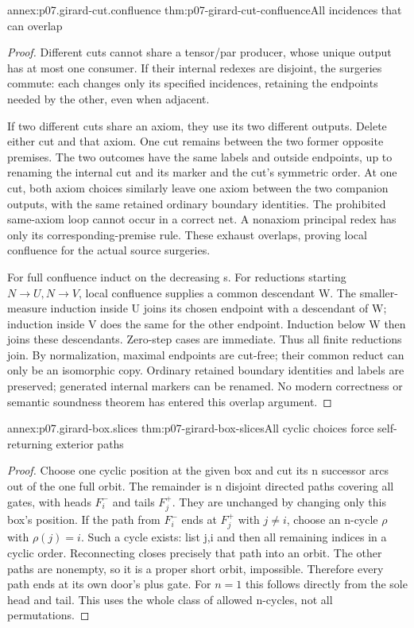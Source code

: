 \begin{annexitem}{annex:p07.girard-cut.confluence}
 {thm:p07-girard-cut-confluence}{All incidences that can overlap}
\begin{proof}
Different cuts cannot share a tensor/par producer, whose unique output
has at most one consumer. If their internal redexes are disjoint,
the surgeries commute: each changes only its specified incidences,
retaining the endpoints needed by the other, even when adjacent.

If two different cuts share an axiom, they use its two different outputs.
Delete either cut and that axiom. One cut remains between the two
former opposite premises. The two outcomes have the same labels and
outside endpoints, up to renaming the internal cut and its marker and
the cut's symmetric order. At one cut, both axiom choices similarly
leave one axiom between the two companion outputs, with the same
retained ordinary boundary identities. The prohibited same-axiom
loop cannot occur in a correct net. A nonaxiom principal redex has
only its corresponding-premise rule. These exhaust overlaps, proving
local confluence for the actual source surgeries.

For full confluence induct on the decreasing s.
For reductions starting \(N\to U,N\to V\), local confluence supplies
a common descendant W. The smaller-measure induction inside U joins
its chosen endpoint with a descendant of W; induction inside V does
the same for the other endpoint. Induction below W then joins these
descendants. Zero-step cases are immediate. Thus all finite reductions
join. By normalization, maximal endpoints are cut-free; their common
reduct can only be an isomorphic copy. Ordinary retained boundary
identities and labels are preserved; generated internal markers can
be renamed. No modern correctness or semantic soundness theorem has
entered this overlap argument.
\end{proof}
\end{annexitem}

\begin{annexitem}{annex:p07.girard-box.slices}
 {thm:p07-girard-box-slices}{All cyclic choices force self-returning exterior paths}
\begin{proof}
Choose one cyclic position at the given box and cut its n successor arcs
out of the one full orbit. The remainder is n disjoint directed paths
covering all gates, with heads \(F_i^-\) and tails \(F_j^+\).
They are unchanged by changing only this box's position.
If the path from \(F_i^-\) ends at \(F_j^+\) with \(j\ne i\),
choose an n-cycle \(\rho\) with \(\rho(j)=i\).
Such a cycle exists: list j,i and then all remaining indices in a
cyclic order. Reconnecting closes precisely that path into an orbit.
The other paths are nonempty, so it is a proper short orbit, impossible.
Therefore every path ends at its own door's plus gate.
For \(n=1\) this follows directly from the sole head and tail.
This uses the whole class of allowed n-cycles, not all permutations.
\end{proof}
\end{annexitem}

